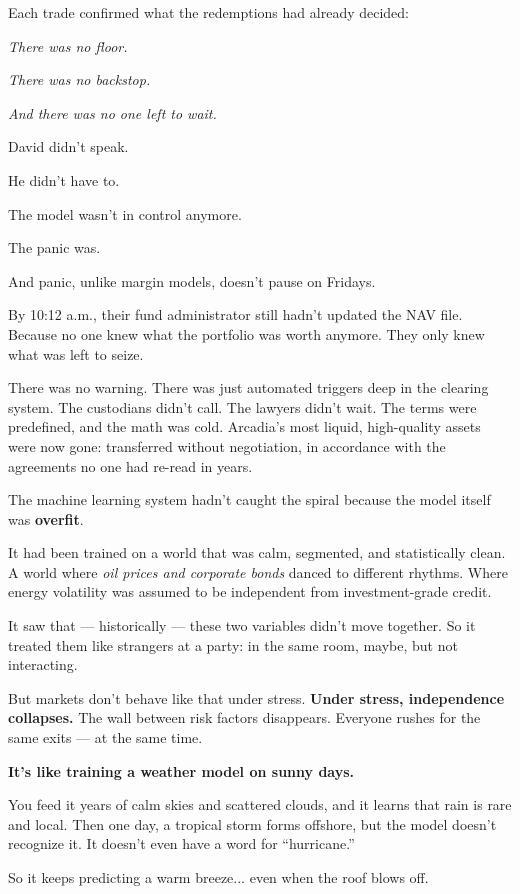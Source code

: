 Each trade confirmed what the redemptions had already decided:

\textit{There was no floor.} 

\textit{There was no backstop.} 

\textit{And there was no one left to wait.}

David didn’t speak.

He didn’t have to.

The model wasn’t in control anymore.  

The panic was.  

And panic, unlike margin models, doesn’t pause on Fridays.


By 10:12 a.m., their fund administrator still hadn’t updated the NAV file.  
Because no one knew what the portfolio was worth anymore.  
They only knew what was left to seize.

There was no warning. There was just automated triggers deep in the clearing system. The custodians didn’t call. 
The lawyers didn’t wait. The terms were predefined, and the math was cold. Arcadia's most liquid, high-quality 
assets were now gone: transferred without negotiation, in accordance with the agreements no one had re-read in years.

The machine learning system hadn’t caught the spiral because the model itself was \textbf{overfit}.

It had been trained on a world that was calm, segmented, and statistically clean. A world where \textit{oil 
prices and corporate bonds} danced to different rhythms. Where energy volatility was assumed to be independent 
from investment-grade credit.

It saw that — historically — these two variables didn’t move together. So it treated them like strangers at a 
party: in the same room, maybe, but not interacting.

But markets don’t behave like that under stress. \textbf{Under stress, independence collapses.} The wall 
between risk factors disappears. Everyone rushes for the same exits — at the same time.

\textbf{It’s like training a weather model on sunny days.}

You feed it years of calm skies and scattered clouds, and it learns that rain is rare and local. Then one 
day, a tropical storm forms offshore, but the model doesn’t recognize it. It doesn’t even have a word for 
``hurricane.''

So it keeps predicting a warm breeze... even when the roof blows off.

